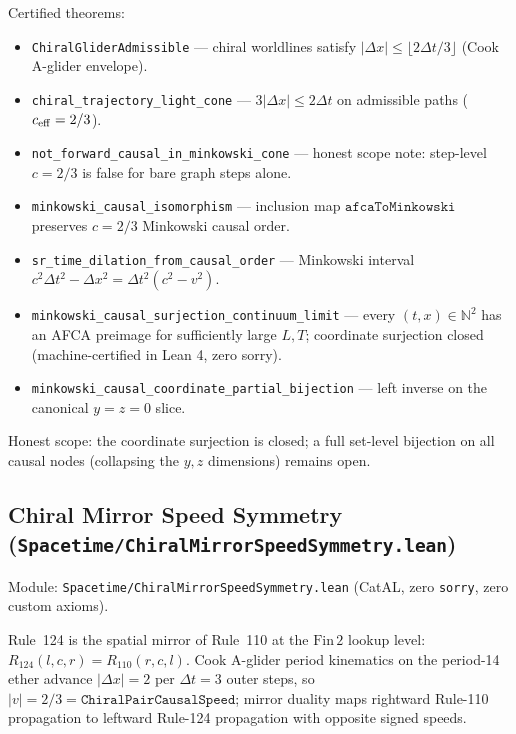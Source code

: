\documentclass[11pt,a4paper]{article}
\theoremstyle{definition}
\begin{document}
Certified theorems:
\begin{itemize}[nosep]
\item \lstinline|ChiralGliderAdmissible| — chiral worldlines satisfy
  $|\Delta x| \le \lfloor 2\Delta t/3 \rfloor$ (Cook A-glider envelope).
\item \lstinline|chiral_trajectory_light_cone| — $3|\Delta x| \le 2\Delta t$
  on admissible paths ($c_{\rm eff} = 2/3$).
\item \lstinline|not_forward_causal_in_minkowski_cone| — honest scope note:
  step-level $c = 2/3$ is false for bare graph steps alone.
\item \lstinline|minkowski_causal_isomorphism| — inclusion map
  $\texttt{afcaToMinkowski}$ preserves $c = 2/3$ Minkowski causal order.
\item \lstinline|sr_time_dilation_from_causal_order| — Minkowski interval
  $c^2\Delta t^2 - \Delta x^2 = \Delta t^2(c^2 - v^2)$.
\item \lstinline|minkowski_causal_surjection_continuum_limit| — every
  $(t,x) \in \mathbb{N}^2$ has an AFCA preimage for sufficiently large $L,T$;
  coordinate surjection closed (machine-certified in Lean 4, zero sorry).
\item \lstinline|minkowski_causal_coordinate_partial_bijection| — left inverse
  on the canonical $y = z = 0$ slice.
\end{itemize}

Honest scope: the coordinate surjection is closed; a full set-level
bijection on all causal nodes (collapsing the $y,z$ dimensions) remains open.

\subsection{Chiral Mirror Speed Symmetry\linebreak
  (\texttt{\small Spacetime/ChiralMirrorSpeedSymmetry.lean})}\label{subsec:chiral-mirror-speed}

Module: \texttt{Spacetime/ChiralMirrorSpeedSymmetry.lean} (CatAL,
zero \lstinline|sorry|, zero custom axioms).

Rule~124 is the spatial mirror of Rule~110 at the $\mathrm{Fin}\,2$ lookup
level: $R_{124}(l,c,r) = R_{110}(r,c,l)$.
Cook A-glider period kinematics on the period-14 ether advance
$|\Delta x| = 2$ per $\Delta t = 3$ outer steps, so
$|v| = 2/3 = \texttt{ChiralPairCausalSpeed}$; mirror duality maps rightward
Rule-110 propagation to leftward Rule-124 propagation with opposite signed
speeds.
\end{document}
